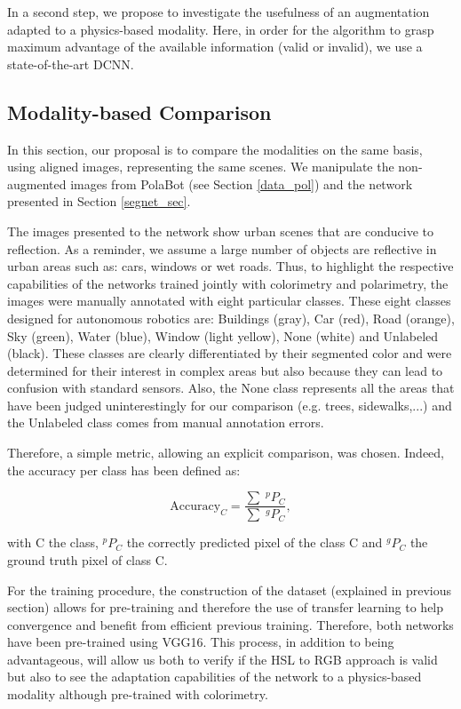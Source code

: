 In a second step, we propose to investigate the usefulness of an augmentation adapted to a physics-based modality. Here, in order for the algorithm to grasp maximum advantage of the available information (valid or invalid), we use a state-of-the-art DCNN. 

\subsection{Modality-based Comparison}

In this section, our proposal is to compare the modalities on the same basis, using aligned images, representing the same scenes.
We manipulate the non-augmented images from PolaBot (see Section \ref{data_pol}) and the network presented in Section \ref{segnet_sec}.

The images presented to the network show urban scenes that are conducive to reflection. As a reminder, we assume a large number of objects are reflective in urban areas such as: cars, windows or wet roads.
Thus, to highlight the respective capabilities of the networks trained jointly with colorimetry and polarimetry, the images were manually annotated with eight particular classes.
These eight classes designed for autonomous robotics are: Buildings (gray), Car (red), Road (orange), Sky (green), Water (blue), Window (light yellow), None (white) and Unlabeled (black). These classes are clearly differentiated by their segmented color and were determined for their interest in complex areas but also because they can lead to confusion with standard sensors. Also, the None class represents all the areas that have been judged uninterestingly for our comparison (e.g. trees, sidewalks,...) and the Unlabeled class comes from manual annotation errors.


Therefore, a simple metric, allowing an explicit comparison, was chosen. Indeed, the accuracy per class has been defined as:


\begin{equation}
\textrm{Accuracy}_C = \frac{\sum \; ^pP_C}{\sum \; ^gP_C},
\end{equation}

with C the class, $^pP_C$ the correctly predicted pixel of the class C and $^gP_C$ the ground truth pixel of class C.

For the training procedure, the construction of the dataset (explained in previous section) allows for pre-training and therefore the use of transfer learning\cite{torrey2010transfer,pan2009survey} to help convergence and benefit from efficient previous training. Therefore, both networks have been pre-trained using VGG16. 
This process, in addition to being advantageous, will allow us both to verify if the HSL to RGB approach is valid but also to see the adaptation capabilities of the network to a physics-based modality although pre-trained with colorimetry.

